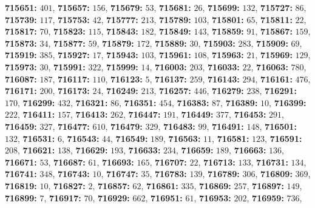 \textsf{\bfseries 715651:} $401$, \textsf{\bfseries 715657:} $156$, \textsf{\bfseries 715679:} $53$, \textsf{\bfseries 715681:} $26$, \textsf{\bfseries 715699:} $132$, \textsf{\bfseries 715727:} $86$, \textsf{\bfseries 715739:} $117$, \textsf{\bfseries 715753:} $42$, \textsf{\bfseries 715777:} $213$, \textsf{\bfseries 715789:} $103$, \textsf{\bfseries 715801:} $65$, \textsf{\bfseries 715811:} $22$, \textsf{\bfseries 715817:} $70$, \textsf{\bfseries 715823:} $115$, \textsf{\bfseries 715843:} $182$, \textsf{\bfseries 715849:} $143$, \textsf{\bfseries 715859:} $91$, \textsf{\bfseries 715867:} $159$, \textsf{\bfseries 715873:} $34$, \textsf{\bfseries 715877:} $59$, \textsf{\bfseries 715879:} $172$, \textsf{\bfseries 715889:} $30$, \textsf{\bfseries 715903:} $283$, \textsf{\bfseries 715909:} $69$, \textsf{\bfseries 715919:} $385$, \textsf{\bfseries 715927:} $17$, \textsf{\bfseries 715943:} $103$, \textsf{\bfseries 715961:} $108$, \textsf{\bfseries 715963:} $21$, \textsf{\bfseries 715969:} $129$, \textsf{\bfseries 715973:} $30$, \textsf{\bfseries 715991:} $322$, \textsf{\bfseries 715999:} $14$, \textsf{\bfseries 716003:} $203$, \textsf{\bfseries 716033:} $22$, \textsf{\bfseries 716063:} $780$, \textsf{\bfseries 716087:} $187$, \textsf{\bfseries 716117:} $110$, \textsf{\bfseries 716123:} $5$, \textsf{\bfseries 716137:} $259$, \textsf{\bfseries 716143:} $294$, \textsf{\bfseries 716161:} $476$, \textsf{\bfseries 716171:} $200$, \textsf{\bfseries 716173:} $24$, \textsf{\bfseries 716249:} $213$, \textsf{\bfseries 716257:} $446$, \textsf{\bfseries 716279:} $238$, \textsf{\bfseries 716291:} $170$, \textsf{\bfseries 716299:} $432$, \textsf{\bfseries 716321:} $86$, \textsf{\bfseries 716351:} $454$, \textsf{\bfseries 716383:} $87$, \textsf{\bfseries 716389:} $10$, \textsf{\bfseries 716399:} $222$, \textsf{\bfseries 716411:} $157$, \textsf{\bfseries 716413:} $262$, \textsf{\bfseries 716447:} $191$, \textsf{\bfseries 716449:} $377$, \textsf{\bfseries 716453:} $291$, \textsf{\bfseries 716459:} $327$, \textsf{\bfseries 716477:} $610$, \textsf{\bfseries 716479:} $329$, \textsf{\bfseries 716483:} $99$, \textsf{\bfseries 716491:} $148$, \textsf{\bfseries 716501:} $132$, \textsf{\bfseries 716531:} $6$, \textsf{\bfseries 716543:} $44$, \textsf{\bfseries 716549:} $189$, \textsf{\bfseries 716563:} $11$, \textsf{\bfseries 716581:} $123$, \textsf{\bfseries 716591:} $208$, \textsf{\bfseries 716621:} $138$, \textsf{\bfseries 716629:} $193$, \textsf{\bfseries 716633:} $234$, \textsf{\bfseries 716659:} $189$, \textsf{\bfseries 716663:} $136$, \textsf{\bfseries 716671:} $53$, \textsf{\bfseries 716687:} $61$, \textsf{\bfseries 716693:} $165$, \textsf{\bfseries 716707:} $22$, \textsf{\bfseries 716713:} $133$, \textsf{\bfseries 716731:} $134$, \textsf{\bfseries 716741:} $348$, \textsf{\bfseries 716743:} $10$, \textsf{\bfseries 716747:} $35$, \textsf{\bfseries 716783:} $139$, \textsf{\bfseries 716789:} $306$, \textsf{\bfseries 716809:} $369$, \textsf{\bfseries 716819:} $10$, \textsf{\bfseries 716827:} $2$, \textsf{\bfseries 716857:} $62$, \textsf{\bfseries 716861:} $335$, \textsf{\bfseries 716869:} $257$, \textsf{\bfseries 716897:} $149$, \textsf{\bfseries 716899:} $7$, \textsf{\bfseries 716917:} $70$, \textsf{\bfseries 716929:} $662$, \textsf{\bfseries 716951:} $61$, \textsf{\bfseries 716953:} $202$, \textsf{\bfseries 716959:} $736$, 
